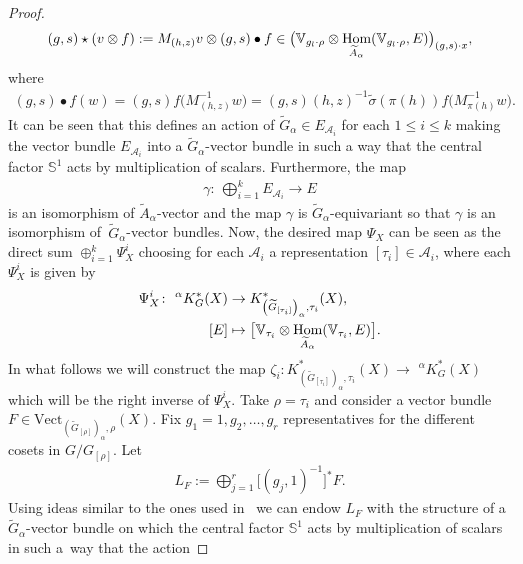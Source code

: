 \documentclass[10pt,a4paper]{amsart}
\def\S{\mathbb{S}}
\def\V{\mathbb{V}}
\DeclareMathOperator{\Hom}{\textup{Hom}}
\theoremstyle{definition}
\numberwithin{equation}{section}
\begin{document}
\begin{proof}
\begin{gather*}
(g,s)\star (v\otimes f):=M_{(h,z)}v\otimes (g,s)\bullet
f \in \big(\V_{g_{l}\cdot\rho}\otimes
\Hom_{\widetilde{A}_{\alpha}}(\V_{g_{l}\cdot\rho},E)\big)_{(g,s)\cdot x},
\end{gather*}
where
\begin{gather*}
(g,s)\bullet f(w)=(g,s)f\big(M_{(h,z)}^{-1}w\big)
=(g,s)(h,z)^{-1}\tilde{\sigma}(\pi(h))f\big(M_{\pi(h)}^{-1}w\big).
\end{gather*}
It can be seen that this defines an action of $\widetilde{G}_{\alpha}\in E_{\mathcal{A}_{i}}$
for each $1\leq i\leq k$ making the vector bundle $E_{\mathcal{A}_{i}}$
into a $\widetilde{G}_{\alpha}$-vector bundle in such a way that the central factor
$\S^{1}$ acts by multiplication of scalars. Furthermore, the map
\begin{gather*}
\gamma\colon\ \bigoplus_{i=1}^{k}E_{\mathcal{A}_{i}} \rightarrow E
\end{gather*}
is an isomorphism of $\widetilde{A}_{\alpha}$-vector and the map $\gamma$ is
$\widetilde{G}_{\alpha}$-equivariant so that $\gamma$ is an isomorphism of~$\widetilde{G}_{\alpha}$-vector bundles. Now, the desired map $\Psi_{X}$ can be seen as the
direct sum $\oplus_{i=1}^{k}\Psi_{X}^{i}$ choosing for each $\mathcal{A}_{i}$ a representation
$[\tau_{i}]\in\mathcal{A}_{i}$, where each $\Psi_{X}^{i}$ is given by
\begin{align*}
\Psi_{X}^{i}\colon \phantom{i}^{\alpha}K_{G}^{\ast}(X)&\rightarrow
K^{*}_{\left(\widetilde{G}_{[\tau_{i}]}\right)_{\alpha},\tau_{i}}(X),
\\
[E]&\mapsto \big[\V_{\tau_{i}}\otimes\Hom_{\widetilde{A}_{\alpha}}(\V_{\tau_{i}},E)\big].
\end{align*}
In what follows we will construct the map
$\zeta_{i}\colon K^{*}_{\left(\widetilde{G}_{[\tau_{i}]}\right)_{\alpha},\tau_{i}}(X)
\rightarrow \phantom{i}^{\alpha}K_{G}^{\ast}(X)$
which will be the right inverse of $\Psi_{X}^{i}$. Take $\rho=\tau_{i}$ and consider
a vector bundle $F\in\text{Vect}_{\left(\widetilde{G}_{[\rho]}\right)_{\alpha},\rho}(X)$.
Fix $g_{1}=1,g_{2},\dots,g_{r}$ representatives for the different cosets in $G/G_{[\rho]}$.
Let
\begin{gather*}
L_{F}:=\bigoplus_{j=1}^{r}\big[(g_{j},1)^{-1}\big]^{\ast} F.
\end{gather*}
Using ideas similar to the ones used in~\cite[Theorem 3.1]{GomezUribe} we can endow $L_{F}$
with the structure of a $\widetilde{G}_{\alpha}$-vector bundle on which the
central factor $\S^{1}$ acts by multiplication of scalars in such a~way that the action

\end{proof}
\end{document}
